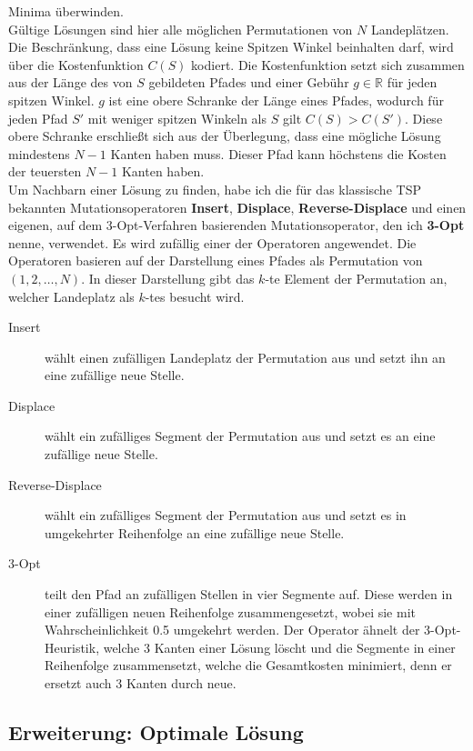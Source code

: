 \documentclass[a4paper,10pt,ngerman]{scrartcl}
\begin{document}
Minima überwinden.\\
Gültige Lösungen sind hier alle möglichen Permutationen von $N$ Landeplätzen. Die Beschränkung, dass eine
Lösung keine Spitzen Winkel beinhalten darf, wird über die Kostenfunktion $C(S)$ kodiert. Die Kostenfunktion
setzt sich zusammen aus der Länge des von $S$ gebildeten Pfades und einer Gebühr $g \in \mathbb{R}$ für jeden spitzen Winkel. $g$
ist eine obere Schranke der Länge eines Pfades, wodurch für jeden Pfad $S'$ mit weniger spitzen Winkeln als $S$
gilt $C(S) > C(S')$. Diese obere Schranke erschließt sich aus der Überlegung, dass eine mögliche Lösung mindestens $N-1$ Kanten haben muss.
Dieser Pfad kann höchstens die Kosten der teuersten $N-1$ Kanten haben. \\
Um Nachbarn einer Lösung zu finden, habe ich die für das klassische TSP bekannten Mutationsoperatoren \textbf{Insert}, \textbf{Displace}, \textbf{Reverse-Displace}
\cite{larranaga_1999}
und einen eigenen, auf dem 3-Opt-Verfahren basierenden Mutationsoperator, den ich \textbf{3-Opt} nenne, verwendet. Es wird zufällig einer der Operatoren angewendet.
Die Operatoren basieren auf der
Darstellung eines Pfades als Permutation von $(1, 2, \ldots, N)$. In dieser Darstellung gibt das $k$-te Element der Permutation
an, welcher Landeplatz als $k$-tes besucht wird.
\begin{description}
  \item[Insert] wählt einen zufälligen Landeplatz der Permutation aus und setzt ihn an
    eine zufällige neue Stelle.
  \item[Displace] wählt ein zufälliges Segment der Permutation aus und setzt es an eine
    zufällige neue Stelle.
  \item[Reverse-Displace] wählt ein zufälliges Segment der Permutation aus und setzt es
    in umgekehrter Reihenfolge an eine zufällige neue Stelle.
  \item[3-Opt] teilt den Pfad an zufälligen Stellen in vier Segmente auf. Diese werden
    in einer zufälligen neuen Reihenfolge zusammengesetzt, wobei sie mit Wahrscheinlichkeit
    0.5 umgekehrt werden. Der Operator ähnelt der 3-Opt-Heuristik, welche 3 Kanten einer
    Lösung löscht und die Segmente in einer Reihenfolge zusammensetzt, welche die Gesamtkosten
    minimiert, denn er ersetzt auch 3 Kanten durch neue.
\end{description}
\subsection{Erweiterung: Optimale Lösung}
\end{document}
